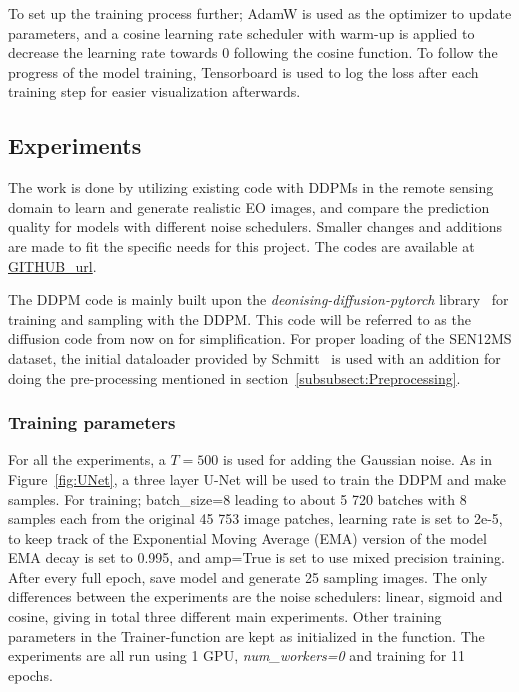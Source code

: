 \documentclass[fullpaper]{nldl}
\begin{document}
To set up the training process further; AdamW is used as the optimizer to update parameters, and a cosine learning rate scheduler with warm-up is applied to decrease the learning rate towards 0 following the cosine function. To follow the progress of the model training, Tensorboard is used to log the loss after each training step for easier visualization afterwards.


\subsection{Experiments}
\label{subsect:Experiments}
The work is done by utilizing existing code with DDPMs in the remote sensing domain to learn and generate realistic EO images, and compare the prediction quality for models with different noise schedulers. Smaller changes and additions are made to fit the specific needs for this project. The codes are available at \url{GITHUB_url}.

The DDPM code is mainly built upon the \textit{deonising-diffusion-pytorch} library~\cite{lucidrains2024} for training and sampling with the DDPM. This code will be referred to as the diffusion code from now on for simplification. For proper loading of the SEN12MS dataset, the initial dataloader provided by Schmitt~\cite{ScmittSEN12MSdataset} is used with an addition for doing the pre-processing mentioned in section~\ref{subsubsect:Preprocessing}.


\subsubsection{Training parameters}
\label{subsubsect:Training Params}
For all the experiments, a $T=500$ is used for adding the Gaussian noise. As in Figure~\ref{fig:UNet}, a three layer U-Net will be used to train the DDPM and make samples. For training; batch\_size=8 leading to about 5 720 batches with 8 samples each from the original 45 753 image patches, learning rate is set to 2e-5, to keep track of the Exponential Moving Average (EMA) version of the model EMA decay is set to 0.995, and amp=True is set to use mixed precision training. After every full epoch, save model and generate 25 sampling images. The only differences between the experiments are the noise schedulers: linear, sigmoid and cosine, giving in total three different main experiments. Other training parameters in the Trainer-function are kept as initialized in the function. The experiments are all run using 1 GPU, \textit{num\_workers=0} and training for 11 epochs.
\end{document}
